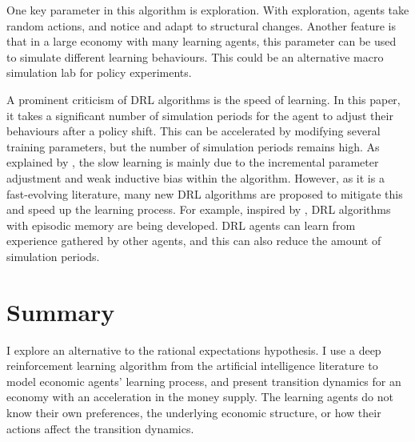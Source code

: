 \documentclass[hidelinks]{article}
\begin{document}
One key parameter in this algorithm is exploration. With exploration, agents take random actions, and notice and adapt to structural changes. Another feature is that in a large economy with many learning agents, this parameter can be used to simulate different learning behaviours. This could be an alternative macro simulation lab for policy experiments. 


A prominent criticism of DRL algorithms is the speed of learning. In this paper, it takes a significant number of simulation periods for the agent to adjust their behaviours after a policy shift. This can be accelerated by modifying several training parameters, but the number of simulation periods remains high. As explained by \cite{Botvinick2019}, the slow learning is mainly due to the incremental parameter adjustment and weak inductive bias within the algorithm. However, as it is a fast-evolving literature, many new DRL algorithms are proposed to mitigate this and speed up the learning process. For example, inspired by \cite{Gershman2017}, DRL algorithms with episodic memory are being developed. DRL agents can learn from experience gathered by other agents, and this can also reduce the amount of simulation periods. 




\section{Summary}
 I explore an alternative to the rational expectations hypothesis. I use a deep reinforcement learning algorithm from the artificial intelligence literature to model economic agents’ learning process, and present transition dynamics for an economy with an acceleration in the money supply. The learning agents do not know their own preferences, the underlying economic structure, or how their actions affect the transition dynamics.
 
\end{document}

